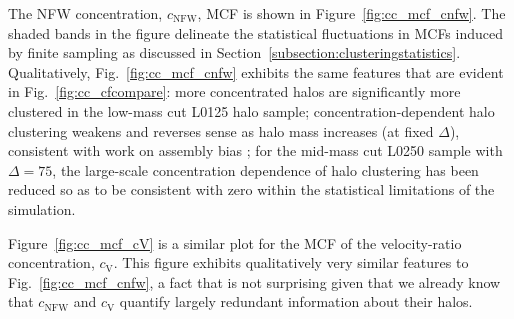 \documentclass[usenatbib]{mnras}
\begin{document}
The NFW concentration, $c_{\mathrm{NFW}}$, MCF is shown in Figure~\ref{fig:cc_mcf_cnfw}. 
The shaded bands in the figure delineate the statistical fluctuations in MCFs induced by 
finite sampling as discussed in Section~\ref{subsection:clusteringstatistics}. 
Qualitatively, Fig.~\ref{fig:cc_mcf_cnfw} exhibits the same features that are evident in 
Fig.~\ref{fig:cc_cfcompare}: more concentrated halos are significantly more clustered in 
the low-mass cut L0125 halo sample; concentration-dependent halo clustering weakens and 
reverses sense as halo mass increases (at fixed $\Delta$), 
consistent with work on assembly bias \citep{wechsler_etal06,sunayama_etal16}; for the 
mid-mass cut L0250 sample with $\Delta=75$, the large-scale concentration dependence of halo clustering has been reduced so as to 
be consistent with zero within the statistical limitations of the simulation.  


Figure~\ref{fig:cc_mcf_cV} is a similar plot for the MCF of the velocity-ratio concentration, $c_{\mathrm{V}}$. 
This figure exhibits qualitatively very similar features to Fig.~\ref{fig:cc_mcf_cnfw}, a 
fact that is not surprising given that we already know that $c_{\mathrm{NFW}}$ and $c_{\mathrm{V}}$ 
quantify largely redundant information about their halos. 
\end{document}
